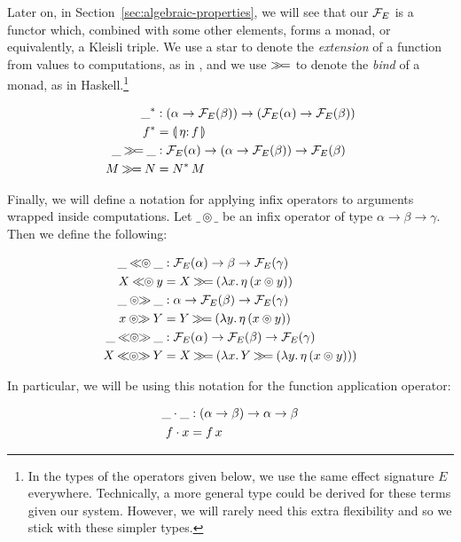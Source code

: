 Later on, in Section~\ref{sec:algebraic-properties}, we will see that our
$\mathcal{F}_E$ is a functor which, combined with some other elements, forms a
monad, or equivalently, a Kleisli triple. We use a star to denote the
\emph{extension} of a function from values to computations, as in
\cite{moggi1991notions}, and we use $\mathbin{\gg\!=}$ to denote the \emph{bind} of
a monad, as in Haskell.\footnote{In the types of the operators given below,
  we use the same effect signature $E$ everywhere. Technically, a more
  general type could be derived for these terms given our system. However,
  we will rarely need this extra flexibility and so we stick with these
  simpler types.}

\begin{align*}
  \_^* &: (\alpha \to \FF_E(\beta)) \to (\FF_E(\alpha) \to \FF_E(\beta)) \\
  f^* &= \banana{\onto{\eta}{f}} \\
  \_ \hsbind \_ &: \FF_E(\alpha) \to (\alpha \to \FF_E(\beta)) \to \FF_E(\beta) \\
  M \hsbind N &= \ap{N^*}{M} \\
\end{align*}

Finally, we will define a notation for applying infix operators to
arguments wrapped inside computations. Let $\_ \circledcirc \_$ be an infix
operator of type $\alpha \to \beta \to \gamma$. Then we define the
following:

\begin{align*}
  \_ \opl{\circledcirc} \_ &: \FF_E(\alpha) \to \beta \to \FF_E(\gamma) \\
  X \opl{\circledcirc} y &= X \hsbind (\lam{x}{\ap{\eta}{(x \circledcirc y)}}) \\
  \_ \opr{\circledcirc} \_ &: \alpha \to \FF_E(\beta) \to \FF_E(\gamma) \\
  x \opr{\circledcirc} Y &= Y \hsbind (\lam{y}{\ap{\eta}{(x \circledcirc y)}}) \\
  \_ \oplr{\circledcirc} \_ &: \FF_E(\alpha) \to \FF_E(\beta) \to \FF_E(\gamma) \\
  X \oplr{\circledcirc} Y &= X \hsbind (\lam{x}{Y \hsbind (\lam{y}{\ap{\eta}{(x \circledcirc y)}})})
\end{align*}

In particular, we will be using this notation for the function application
operator:

\begin{align*}
  \_ \cdot \_ &: (\alpha \to \beta) \to \alpha \to \beta \\
  f \cdot x &= f\,x
\end{align*}

